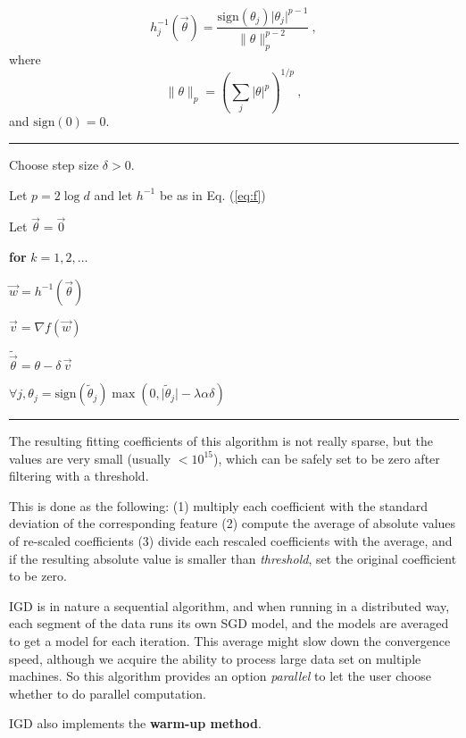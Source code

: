 \begin{equation} \label{eq:f}
h_j^{-1}(\vec{\theta}) = \frac{\mbox{sign}(\theta_j)\vert \theta_j
  \vert^{p-1}}{\|\theta\|_p^{p-2}}\ ,
\end{equation}
where
\begin{equation}
\|\theta\|_p = \left(\sum_j \vert \theta \vert ^p\right)^{1/p}\ ,
\end{equation}
and $\mbox{sign}(0) = 0$.
\vspace{0.2in}
\hrule
\vspace{0.2in}
Choose step size $\delta > 0$.

Let $p = 2\log d$ and let $h^{-1}$ be as in Eq. (\ref{eq:f})

Let $\vec{\theta} = \vec{0}$

\textbf{for} $k = 1,2,\dots$

\quad $\vec{w} = h^{-1}(\vec{\theta})$

\quad $\vec{v} = \nabla f(\vec{w})$

\quad $\tilde{\vec{\theta}} = \theta - \delta \, \vec{v}$

\quad $\forall j, \theta_j = \mbox{sign}(\tilde{\theta}_j)\max (0,
\vert \tilde{\theta}_j \vert- \lambda\alpha\delta)$
\vspace{0.2in}
\hrule
\vspace{0.2in}

The resulting fitting coefficients of this algorithm is not really
sparse, but the values are very small (usually $< 10^{15}$), which can
be safely set to be zero after filtering with a threshold.

This is done as the following: (1) multiply each coefficient with the
standard deviation of the corresponding feature (2) compute the
average of absolute values of re-scaled coefficients (3) divide each
rescaled coefficients with the average, and if the resulting absolute
value is smaller than \emph{threshold}, set the original coefficient
to be zero.

IGD is in nature a sequential algorithm, and when running in a
distributed way, each segment of the data runs its own SGD model, and
the models are averaged to get a model for each iteration. This
average might slow down the convergence speed, although we acquire the
ability to process large data set on multiple machines. So this
algorithm provides an option  \emph{parallel} to let the user choose
whether to do parallel computation.

IGD also implements the \textbf{warm-up method}.

